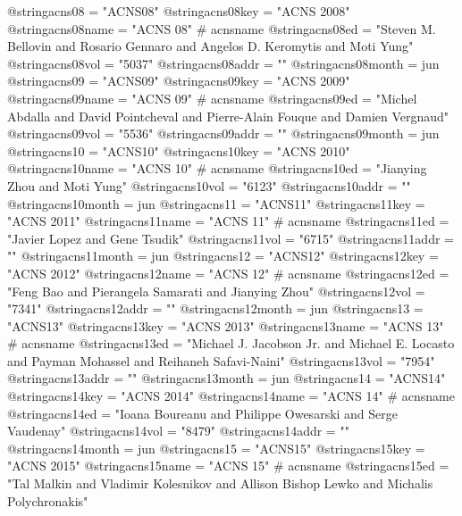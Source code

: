 @string{acns08 =                "ACNS08"}
@string{acns08key =             "ACNS 2008"}
@string{acns08name =            "ACNS 08" # acnsname}
@string{acns08ed =              "Steven M. Bellovin and Rosario Gennaro and Angelos D. Keromytis and Moti Yung"}
@string{acns08vol =             "5037"}
@string{acns08addr =            ""}
@string{acns08month =           jun}
@string{acns09 =                "ACNS09"}
@string{acns09key =             "ACNS 2009"}
@string{acns09name =            "ACNS 09" # acnsname}
@string{acns09ed =              "Michel Abdalla and David Pointcheval and Pierre-Alain Fouque and Damien Vergnaud"}
@string{acns09vol =             "5536"}
@string{acns09addr =            ""}
@string{acns09month =           jun}
@string{acns10 =                "ACNS10"}
@string{acns10key =             "ACNS 2010"}
@string{acns10name =            "ACNS 10" # acnsname}
@string{acns10ed =              "Jianying Zhou and Moti Yung"}
@string{acns10vol =             "6123"}
@string{acns10addr =            ""}
@string{acns10month =           jun}
@string{acns11 =                "ACNS11"}
@string{acns11key =             "ACNS 2011"}
@string{acns11name =            "ACNS 11" # acnsname}
@string{acns11ed =              "Javier Lopez and Gene Tsudik"}
@string{acns11vol =             "6715"}
@string{acns11addr =            ""}
@string{acns11month =           jun}
@string{acns12 =                "ACNS12"}
@string{acns12key =             "ACNS 2012"}
@string{acns12name =            "ACNS 12" # acnsname}
@string{acns12ed =              "Feng Bao and Pierangela Samarati and Jianying Zhou"}
@string{acns12vol =             "7341"}
@string{acns12addr =            ""}
@string{acns12month =           jun}
@string{acns13 =                "ACNS13"}
@string{acns13key =             "ACNS 2013"}
@string{acns13name =            "ACNS 13" # acnsname}
@string{acns13ed =              "Michael J. {Jacobson Jr.} and Michael E. Locasto and Payman Mohassel and Reihaneh Safavi-Naini"}
@string{acns13vol =             "7954"}
@string{acns13addr =            ""}
@string{acns13month =           jun}
@string{acns14 =                "ACNS14"}
@string{acns14key =             "ACNS 2014"}
@string{acns14name =            "ACNS 14" # acnsname}
@string{acns14ed =              "Ioana Boureanu and Philippe Owesarski and Serge Vaudenay"}
@string{acns14vol =             "8479"}
@string{acns14addr =            ""}
@string{acns14month =           jun}
@string{acns15 =                "ACNS15"}
@string{acns15key =             "ACNS 2015"}
@string{acns15name =            "ACNS 15" # acnsname}
@string{acns15ed =              "Tal Malkin and Vladimir Kolesnikov and Allison Bishop Lewko and Michalis Polychronakis"}
